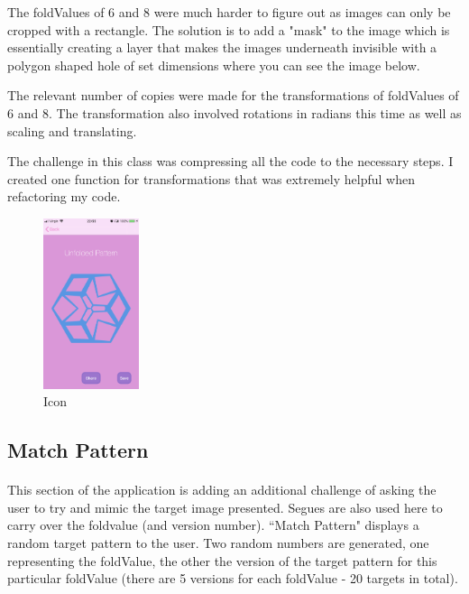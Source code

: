 \documentclass[11pt]{article}
\begin{document}
            The foldValues of 6 and 8 were much harder to figure out as images can only be cropped with a rectangle. The solution is to add a "mask" to the image which is essentially creating a layer that makes the images underneath invisible with a polygon shaped hole of set dimensions where you can see the image below. 
            
            The relevant number of copies were made for the transformations of foldValues of 6 and 8. The transformation also involved rotations in radians this time as well as scaling and translating. 
            
            The challenge in this class was compressing all the code to the necessary steps. I created one function for transformations that was extremely helpful when refactoring my code. 
            
            \begin{figure}
                        \centering
                        \includegraphics[width=0.25\textwidth]{KiriZen/createUnfoldedPattern.png}
                        \caption{Icon}
                        \label{fig:kiriZen-createUnfoldedPattern}
                    \end{figure}


    \subsection{Match Pattern}
            \paragraph{}
            This section of the application is adding an additional challenge of asking the user to try and mimic the target image presented. Segues are also used here to carry over the foldvalue (and version number).
           ``Match Pattern" displays a random target pattern to the user. Two random numbers are generated, one representing the foldValue, the other the version of the target pattern for this particular foldValue (there are 5 versions for each foldValue - 20 targets in total).
\end{document}
